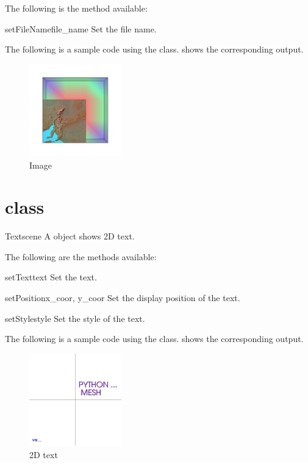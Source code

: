 The following is the method available:
\begin{methoddesc}[Image]{setFileName}{file_name}
Set the file name.
\end{methoddesc}

The following is a sample code using the \Image class.
 shows the corresponding output.


\begin{figure}[ht]
\begin{center}
\includegraphics[width=40mm]{figures/Image}
\end{center}
\caption{Image}
\label{fig:image.1}
\end{figure}

\section{\Text class}
\begin{classdesc}{Text}{scene}
A \Text object shows 2D text. 
\end{classdesc}

The following are the methods available:
\begin{methoddesc}[Text]{setText}{text}
Set the text.
\end{methoddesc}

\begin{methoddesc}[Text]{setPosition}{x_coor, y_coor}
Set the display position of the text.
\end{methoddesc}

\begin{methoddesc}[Text]{setStyle}{style}
Set the style of the text.
\end{methoddesc}

The following is a sample code using the \Text class.
 shows the corresponding output.


\begin{figure}[ht]
\begin{center}
\includegraphics[width=40mm]{figures/Text}
\end{center}
\caption{2D text}
\label{fig:text.1}
\end{figure}

